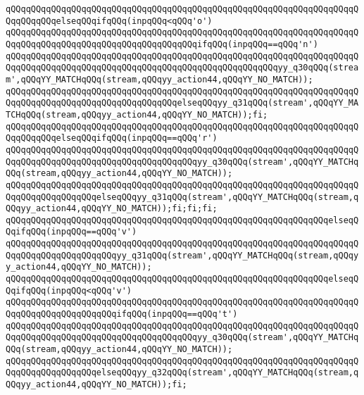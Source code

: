 \verb|qQQqqQQqqQQqqQQqqQQqqQQqqQQqqQQqqQQqqQQqqQQqqQQqqQQqqQQqqQQqqQQqqQQqqQQqqQQqqQQqelseqQQqifqQQq(inpqQQq<qQQq'o')|\newline
\verb|qQQqqQQqqQQqqQQqqQQqqQQqqQQqqQQqqQQqqQQqqQQqqQQqqQQqqQQqqQQqqQQqqQQqqQQqqQQqqQQqqQQqqQQqqQQqqQQqqQQqqQQqqQQqifqQQq(inpqQQq==qQQq'n')|\newline
\verb|qQQqqQQqqQQqqQQqqQQqqQQqqQQqqQQqqQQqqQQqqQQqqQQqqQQqqQQqqQQqqQQqqQQqqQQqqQQqqQQqqQQqqQQqqQQqqQQqqQQqqQQqqQQqqQQqqQQqqQQqqQQqyy_q30qQQq(stream',qQQqYY_MATCHqQQq(stream,qQQqyy_action44,qQQqYY_NO_MATCH));|\newline
\verb|qQQqqQQqqQQqqQQqqQQqqQQqqQQqqQQqqQQqqQQqqQQqqQQqqQQqqQQqqQQqqQQqqQQqqQQqqQQqqQQqqQQqqQQqqQQqqQQqqQQqqQQqelseqQQqyy_q31qQQq(stream',qQQqYY_MATCHqQQq(stream,qQQqyy_action44,qQQqYY_NO_MATCH));fi;|\newline
\verb|qQQqqQQqqQQqqQQqqQQqqQQqqQQqqQQqqQQqqQQqqQQqqQQqqQQqqQQqqQQqqQQqqQQqqQQqqQQqqQQqelseqQQqifqQQq(inpqQQq==qQQq'r')|\newline
\verb|qQQqqQQqqQQqqQQqqQQqqQQqqQQqqQQqqQQqqQQqqQQqqQQqqQQqqQQqqQQqqQQqqQQqqQQqqQQqqQQqqQQqqQQqqQQqqQQqqQQqqQQqqQQqyy_q30qQQq(stream',qQQqYY_MATCHqQQq(stream,qQQqyy_action44,qQQqYY_NO_MATCH));|\newline
\verb|qQQqqQQqqQQqqQQqqQQqqQQqqQQqqQQqqQQqqQQqqQQqqQQqqQQqqQQqqQQqqQQqqQQqqQQqqQQqqQQqqQQqqQQqelseqQQqyy_q31qQQq(stream',qQQqYY_MATCHqQQq(stream,qQQqyy_action44,qQQqYY_NO_MATCH));fi;fi;fi;|\newline
\verb|qQQqqQQqqQQqqQQqqQQqqQQqqQQqqQQqqQQqqQQqqQQqqQQqqQQqqQQqqQQqqQQqelseqQQqifqQQq(inpqQQq==qQQq'v')|\newline
\verb|qQQqqQQqqQQqqQQqqQQqqQQqqQQqqQQqqQQqqQQqqQQqqQQqqQQqqQQqqQQqqQQqqQQqqQQqqQQqqQQqqQQqqQQqqQQqyy_q31qQQq(stream',qQQqYY_MATCHqQQq(stream,qQQqyy_action44,qQQqYY_NO_MATCH));|\newline
\verb|qQQqqQQqqQQqqQQqqQQqqQQqqQQqqQQqqQQqqQQqqQQqqQQqqQQqqQQqqQQqqQQqelseqQQqifqQQq(inpqQQq<qQQq'v')|\newline
\verb|qQQqqQQqqQQqqQQqqQQqqQQqqQQqqQQqqQQqqQQqqQQqqQQqqQQqqQQqqQQqqQQqqQQqqQQqqQQqqQQqqQQqqQQqqQQqifqQQq(inpqQQq==qQQq't')|\newline
\verb|qQQqqQQqqQQqqQQqqQQqqQQqqQQqqQQqqQQqqQQqqQQqqQQqqQQqqQQqqQQqqQQqqQQqqQQqqQQqqQQqqQQqqQQqqQQqqQQqqQQqqQQqqQQqyy_q30qQQq(stream',qQQqYY_MATCHqQQq(stream,qQQqyy_action44,qQQqYY_NO_MATCH));|\newline
\verb|qQQqqQQqqQQqqQQqqQQqqQQqqQQqqQQqqQQqqQQqqQQqqQQqqQQqqQQqqQQqqQQqqQQqqQQqqQQqqQQqqQQqqQQqelseqQQqyy_q32qQQq(stream',qQQqYY_MATCHqQQq(stream,qQQqyy_action44,qQQqYY_NO_MATCH));fi;|\newline
